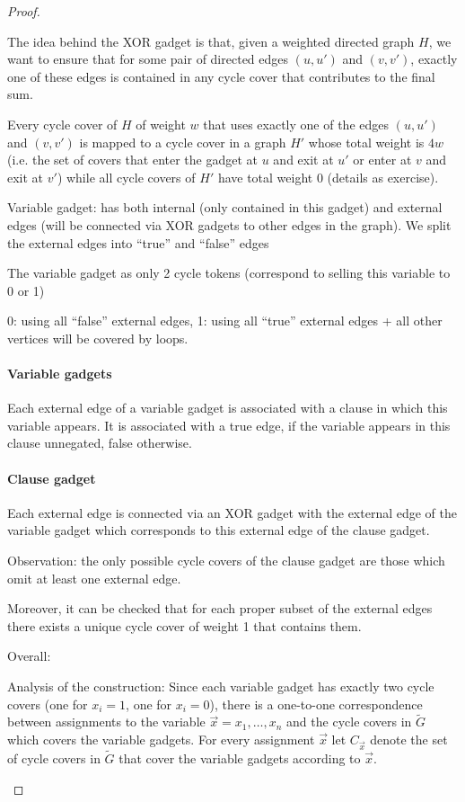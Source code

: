 \documentclass[11pt]{article}
\theoremstyle{definition}
\theoremstyle{definition}
\begin{document}
\begin{proof}
\begin{enumerate}
The idea behind the XOR gadget is that, given a weighted directed graph $ H $, we want to ensure that for some pair of directed edges $ (u, u') $ and $ (v, v')$, exactly one of these edges is contained in any cycle cover that contributes to the final sum.

Every cycle cover of $ H $ of weight $ w $ that uses exactly one of the edges $ (u, u') $ and $ (v, v') $ is mapped to a cycle cover in a graph $ H' $ whose total weight is $ 4w$ (i.e. the set of covers that enter the gadget at $ u $ and exit at $ u' $ or enter at $ v $ and exit at $ v' $) while all cycle covers of $ H' $ have total weight 0 (details as exercise).

Variable gadget: has both internal (only contained in this gadget) and external edges (will be connected via XOR gadgets to other edges in the graph). We split the external edges into ``true'' and ``false'' edges

The variable gadget as only 2 cycle tokens (correspond to selling this variable to 0 or 1)

0: using all ``false'' external edges, 1: using all ``true'' external edges + all other vertices will be covered by loops.

\paragraph{Variable gadgets}
Each external edge of a variable gadget is associated with a clause in which this variable appears. It is associated with a true edge, if the variable appears in this clause unnegated, false otherwise.

\paragraph{Clause gadget}

Each external edge is connected via an XOR gadget with the external edge of the variable gadget which corresponds to this external edge of the clause gadget.

Observation: the only possible cycle covers of the clause gadget are those which omit at least one external edge.

Moreover, it can be checked that for each proper subset of the external edges there exists a unique cycle cover of weight 1 that contains them.

Overall:

Analysis of the construction:
Since each variable gadget has exactly two cycle covers (one for $ x_i = 1 $, one for $ x_i = 0 $), there is a one-to-one correspondence between assignments to the variable $ \overrightarrow x = x_1, \dots, x_n $ and the cycle covers in $ \tilde G $ which covers the variable gadgets. For every assignment $ \overrightarrow x $ let $ C_{\overrightarrow x} $ denote the set of cycle covers in $ \tilde G $ that cover the variable gadgets according to $ \overrightarrow x $.


\end{enumerate}
\end{proof}
\end{document}
